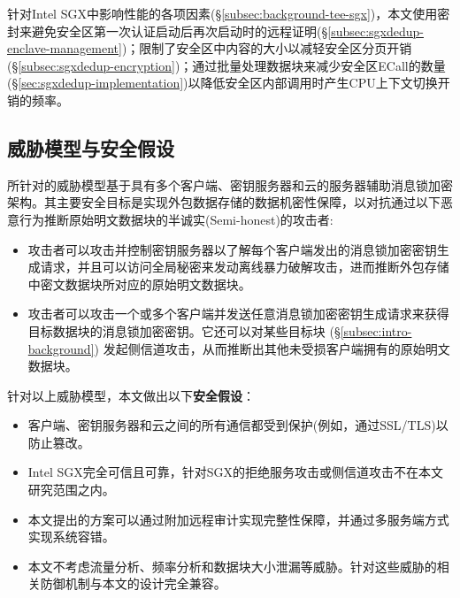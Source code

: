针对Intel SGX中影响性能的各项因素(\S\ref{subsec:background-tee-sgx})，本文使用密封来避免安全区第一次认证启动后再次启动时的远程证明(\S\ref{subsec:sgxdedup-enclave-management})；限制了安全区中内容的大小以减轻安全区分页开销(\S\ref{subsec:sgxdedup-encryption})；通过批量处理数据块来减少安全区ECall的数量(\S\ref{sec:sgxdedup-implementation})以降低安全区内部调用时产生CPU上下文切换开销的频率。

\subsection{威胁模型与安全假设}
\label{subsec:sgxdedup-threat}

\sysnameS 所针对的威胁模型基于具有多个客户端、密钥服务器和云的服务器辅助消息锁加密架构。其主要安全目标是实现外包数据存储的数据机密性保障，以对抗通过以下恶意行为推断原始明文数据块的半诚实(Semi-honest)的攻击者:

\begin{itemize}[leftmargin=0em]
    \item 攻击者可以攻击并控制密钥服务器以了解每个客户端发出的消息锁加密密钥生成请求，并且可以访问全局秘密来发动离线暴力破解攻击，进而推断外包存储中密文数据块所对应的原始明文数据块。
    \item 攻击者可以攻击一个或多个客户端并发送任意消息锁加密密钥生成请求来获得目标数据块的消息锁加密密钥。它还可以对某些目标块  (\S\ref{subsec:intro-background}) 发起侧信道攻击，从而推断出其他未受损客户端拥有的原始明文数据块。
\end{itemize}

针对以上威胁模型，本文做出以下\textbf{安全假设}：

\begin{itemize}[leftmargin=0em]
    \item 客户端、密钥服务器和云之间的所有通信都受到保护(例如，通过SSL/TLS)以防止篡改。
    \item Intel SGX完全可信且可靠，针对SGX的拒绝服务攻击或侧信道攻击不在本文研究范围之内。
    \item 本文提出的方案可以通过附加远程审计实现完整性保障，并通过多服务端方式实现系统容错。
    \item 本文不考虑流量分析、频率分析和数据块大小泄漏等威胁。针对这些威胁的相关防御机制与本文的设计完全兼容。
\end{itemize}
